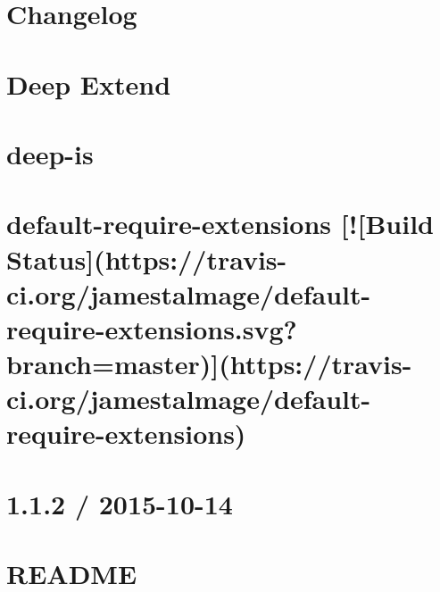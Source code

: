 \documentclass[twoside]{book}
\newcommand{\+}{\discretionary{\mbox{\scriptsize$\hookleftarrow$}}{}{}}
\begin{document}
\chapter{Changelog}
\label{md__c_1_workspace_demo_src_main_script_node_modules_deep-extend__c_h_a_n_g_e_l_o_g}

\chapter{Deep Extend}
\label{md__c_1_workspace_demo_src_main_script_node_modules_deep-extend__r_e_a_d_m_e}

\chapter{deep-\/is}
\label{md__c_1_workspace_demo_src_main_script_node_modules_deep-is__r_e_a_d_m_e}

\chapter{default-\/require-\/extensions \mbox{[}!\mbox{[}Build Status\mbox{]}(https\+://travis-\/ci.org/jamestalmage/default-\/require-\/extensions.svg?branch=master)\mbox{]}(https\+://travis-\/ci.org/jamestalmage/default-\/require-\/extensions)}
\label{md__c_1_workspace_demo_src_main_script_node_modules_default-require-extensions_readme}

\chapter{1.1.2 / 2015-\/10-\/14}
\label{md__c_1_workspace_demo_src_main_script_node_modules_define-properties__c_h_a_n_g_e_l_o_g}

\chapter{R\+E\+A\+D\+ME}
\label{md__c_1_workspace_demo_src_main_script_node_modules_define-properties__r_e_a_d_m_e}

\end{document}
